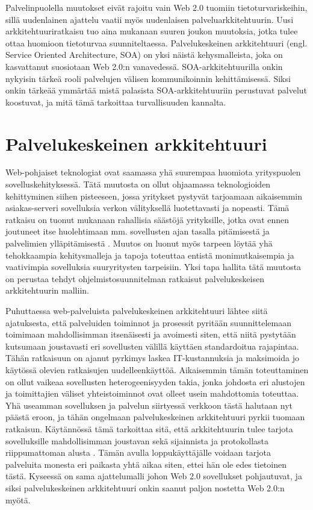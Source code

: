 Palvelinpuolella muutokset eivät rajoitu vain Web 2.0 tuomiin
tietoturvariskeihin, sillä uudenlainen ajattelu vaatii myös uudenlaisen
palveluarkkitehtuurin. Uusi arkkitehtuuriratkaisu tuo aina mukanaan suuren
joukon muutoksia, jotka tulee ottaa huomioon tietoturvaa suunniteltaessa.
Palvelukeskeinen arkkitehtuuri (engl. Service Oriented Architecture, SOA) on
yksi näistä kehysmalleista, joka on kasvattanut suosiotaan Web 2.0:n
vanavedessä. SOA-arkkitehtuurilla onkin nykyisin tärkeä rooli palvelujen
välisen kommunikoinnin kehittämisessä. Siksi onkin tärkeää ymmärtää mistä
palasista SOA-arkkitehtuuriin perustuvat palvelut koostuvat, ja mitä tämä
tarkoittaa turvallisuuden kannalta.

\section{Palvelukeskeinen arkkitehtuuri}

Web-pohjaiset teknologiat ovat saamassa yhä suurempaa huomiota yrityspuolen
sovelluskehityksessä. Tätä muutosta on ollut ohjaamassa teknologioiden
kehittyminen siihen pisteeseen, jossa yritykset pystyvät tarjoamaan aikaisemmin
asiakas-serveri sovelluksia verkon välityksellä luotettavasti ja nopeasti. Tämä
ratkaisu on tuonut mukanaan rahallisia säästöjä yrityksille, jotka ovat ennen
joutuneet itse huolehtimaan mm. sovellusten ajan tasalla pitämisestä ja
palvelimien ylläpitämisestä \cite{WEB2}. Muutos on luonut myös tarpeen löytää yhä
tehokkaampia kehitysmalleja ja tapoja toteuttaa entistä monimutkaisempia ja
vaativimpia sovelluksia suuryritysten tarpeisiin. Yksi tapa hallita tätä
muutosta on perustaa tehdyt ohjelmistosuunnitelman ratkaisut palvelukeskeisen
arkkitehtuurin malliin.

Puhuttaessa web-palveluista palvelukeskeinen arkkitehtuuri lähtee siitä
ajatuksesta, että palveluiden toiminnot ja prosessit pyritään suunnittelemaan
toimimaan mahdollisimman itsenäisesti ja avoimesti siten, että niitä pystytään
kutsumaan joustavasti eri sovellusten välillä käyttäen standardoitua rajapintaa.
Tähän ratkaisuun on ajanut pyrkimys laskea IT-kustannuksia ja maksimoida jo
käytössä olevien ratkaisujen uudelleenkäyttöä. Aikaisemmin tämän toteuttaminen
on ollut vaikeaa sovellusten heterogeenisyyden takia, jonka johdosta eri
alustojen ja toimittajien väliset yhteistoiminnot ovat olleet usein mahdottomia
toteuttaa. Yhä useamman sovelluksen ja palvelun siirtyessä verkkoon tästä
halutaan nyt päästä eroon, ja tähän ongelmaan palvelukeskeinen arkkitehtuuri
pyrkii tuomaan ratkaisun. Käytännössä tämä tarkoittaa sitä, että arkkitehtuurin
tulee tarjota sovelluksille mahdollisimman joustavan sekä sijainnista ja
protokollasta riippumattoman alusta \cite{SOA}. Tämän avulla loppukäyttäjälle
voidaan tarjota palveluita monesta eri paikasta yhtä aikaa siten, ettei hän ole
edes tietoinen tästä. Kyseessä on sama ajattelumalli johon Web 2.0 sovellukset
pohjautuvat, ja siksi palvelukeskeinen arkkitehtuuri onkin saanut paljon
nostetta Web 2.0:n myötä.

